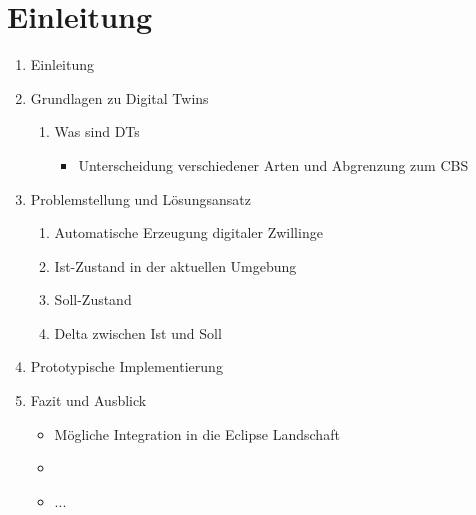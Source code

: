\documentclass[
	12pt,
	BCOR=5mm,
	DIV=12,
	headinclude=on,
	footinclude=off,
	parskip=half,
	bibliography=totoc,
	listof=entryprefix,
	toc=listof,
	numbers=noenddot,
	plainfootsepline
]{scrreprt}
\begin{document}






\normalfont



\tableofcontents

\listoffigures





\clearpage
\ihead{\chaptername~\thechapter}
\ohead{\headmark}

\chapter{Einleitung}

\begin{enumerate}
	\item Einleitung
	\item Grundlagen zu Digital Twins
	\begin{enumerate}
		\item Was sind DTs
		\begin{itemize}
			\item Unterscheidung verschiedener Arten und Abgrenzung zum CBS
		\end{itemize}
	\end{enumerate}
	\item Problemstellung und Lösungsansatz
	\begin{enumerate}
		\item Automatische Erzeugung digitaler Zwillinge
		\item Ist-Zustand in der aktuellen Umgebung
		\item Soll-Zustand
		\item Delta zwischen Ist und Soll
	\end{enumerate}
	\item Prototypische Implementierung 
	\item Fazit und Ausblick
	\begin{itemize}
		\item Mögliche Integration in die Eclipse Landschaft
		\item 
		\item ...
	\end{itemize}
\end{enumerate}
\end{document}
